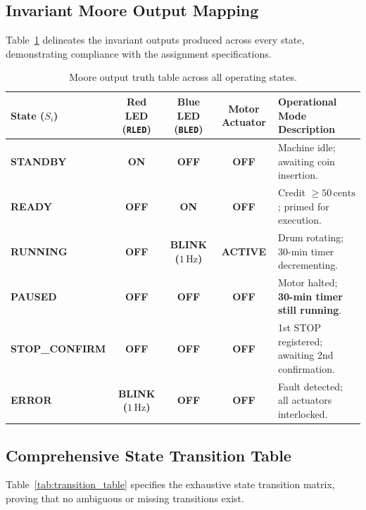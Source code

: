 \documentclass[12pt]{article}
\begin{document}
\subsection{Invariant Moore Output Mapping}
Table~\ref{tab:moore_outputs} delineates the invariant outputs produced across every state, demonstrating compliance with the assignment specifications.

\begin{table}[H]
\centering
\small
\renewcommand{\arraystretch}{1.3}
\begin{tabularx}{\textwidth}{l c c c X}
\toprule
\textbf{State ($S_i$)} & \textbf{Red LED (\texttt{RLED})} & \textbf{Blue LED (\texttt{BLED})} & \textbf{Motor Actuator} & \textbf{Operational Mode Description} \\
\midrule
\textbf{STANDBY} & \textbf{ON} & \textbf{OFF} & \textbf{OFF} & Machine idle; awaiting coin insertion. \\
\textbf{READY} & \textbf{OFF} & \textbf{ON} & \textbf{OFF} & Credit $\ge 50\,\text{cents}$; primed for execution. \\
\textbf{RUNNING} & \textbf{OFF} & \textbf{BLINK ($1\,\text{Hz}$)} & \textbf{ACTIVE} & Drum rotating; 30-min timer decrementing. \\
\textbf{PAUSED} & \textbf{OFF} & \textbf{OFF} & \textbf{OFF} & Motor halted; \textbf{30-min timer still running}. \\
\textbf{STOP\_CONFIRM} & \textbf{OFF} & \textbf{OFF} & \textbf{OFF} & 1st STOP registered; awaiting 2nd confirmation. \\
\textbf{ERROR} & \textbf{BLINK ($1\,\text{Hz}$)} & \textbf{OFF} & \textbf{OFF} & Fault detected; all actuators interlocked. \\
\bottomrule
\end{tabularx}
\caption{Moore output truth table across all operating states.}
\label{tab:moore_outputs}
\end{table}

\subsection{Comprehensive State Transition Table}
Table~\ref{tab:transition_table} specifies the exhaustive state transition matrix, proving that no ambiguous or missing transitions exist.
\end{document}
